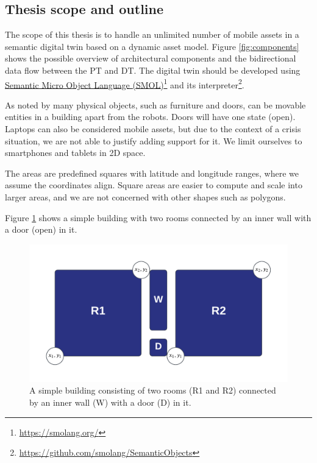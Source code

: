 \documentclass{article}
\begin{document}
\subsection{Thesis scope and outline}\label{subsec:Scope}
The scope of this thesis is to handle an unlimited number of mobile assets in a semantic digital twin based on a dynamic asset model. Figure \ref{fig:components} shows the possible overview of architectural components and the bidirectional data flow between the PT and DT. The digital twin should be developed using \hyperref[subsec:SMOL]{Semantic Micro Object Language (SMOL)}\footnote{\url{https://smolang.org/}} and its interpreter\footnote{\url{https://github.com/smolang/SemanticObjects}}.

As noted by \citeauthor{pauwels_live_2023} many physical objects, such as furniture and doors, can be movable entities in a building apart from the robots. Doors will have one state (open). Laptops can also be considered mobile assets, but due to the context of a crisis situation, we are not able to justify adding support for it. We limit ourselves to smartphones and tablets in 2D space.  

The areas are predefined squares with latitude and longitude ranges, where we assume the coordinates align. Square areas are easier to compute and scale into larger areas, and we are not concerned with other shapes such as polygons. 

Figure \ref{fig:simple_building} shows a simple building with two rooms connected by an inner wall with a door (open) in it.

\begin{figure}[H]
    \centering
    \includegraphics[scale=0.3]{graphics/simple_building.png}
    \caption{A simple building consisting of two rooms (R1 and R2) connected by an inner wall (W) with a door (D) in it.}
    \label{fig:simple_building}
\end{figure}
\end{document}
